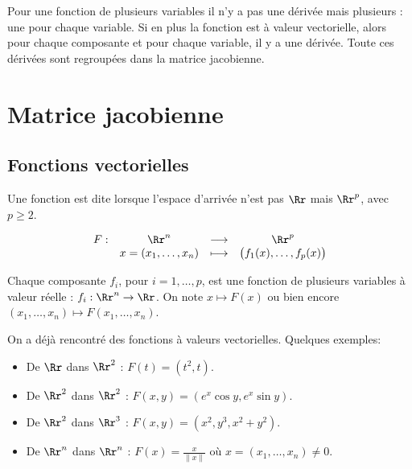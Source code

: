 \documentclass[12pt, class=report,crop=false]{standalone}
\begin{document}


\newcommand{\grad}{\operatorname{grad}} %
\newcommand{\diver}{\operatorname{div}}
\newcommand{\rot}{\operatorname{rot}}


Pour une fonction de plusieurs variables il n'y a pas une dérivée mais plusieurs : une pour chaque variable. Si en plus la fonction est à valeur vectorielle, alors pour chaque composante et pour chaque variable, il y a une dérivée. Toute ces dérivées sont regroupées dans la matrice jacobienne.

\section{Matrice jacobienne}

\subsection{Fonctions vectorielles}


Une fonction est dite  lorsque l'espace d'arrivée n'est pas $\Rr$ mais $\Rr^p$, avec $p\ge2$.

$$\begin{array}{cccc}
F : & \Rr^n & \longrightarrow & \Rr^p \\
    & x=(x_1,\ldots,x_n) & \longmapsto & \big( f_1(x), \ldots, f_p(x) \big) \\
\end{array}$$
    
Chaque composante $f_i$, pour $i=1,\ldots,p$, est une fonction de plusieurs variables à valeur réelle : $f_i : \Rr^n \to \Rr$. On note  $x \mapsto F(x)$ ou bien encore $(x_1,\ldots,x_n) \mapsto F(x_1,\ldots,x_n)$.


On a déjà rencontré des fonctions à valeurs vectorielles. Quelques exemples:
\begin{itemize}
\item De $\Rr$ dans $\Rr^2$ : $F(t) = (t^2,t)$.
\item De $\Rr^2$ dans $\Rr^2$ : $F(x,y) = (e^x \cos y , e^x \sin y)$.
\item De $\Rr^2$ dans $\Rr^3$ : $F(x,y) = (x^2,y^3, x^2 + y^2)$.
\item De $\Rr^n$ dans $\Rr^n$ : $F(x) = \displaystyle \frac{x}{\|x\|}$ où $x = (x_1,\ldots,x_n) \neq 0$.
\end{itemize}
\end{document}
